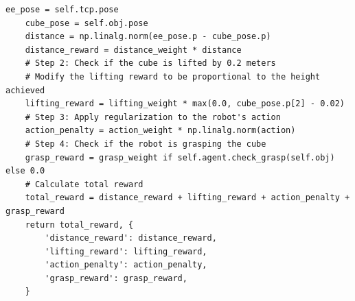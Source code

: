\documentclass{article}
\theoremstyle{plain}
\theoremstyle{definition}
\theoremstyle{remark}
\begin{document}
\begin{table}[!ht]
\begin{tcolorbox}
\begin{lstlisting}[breaklines]
    ee_pose = self.tcp.pose
    cube_pose = self.obj.pose
    distance = np.linalg.norm(ee_pose.p - cube_pose.p)
    distance_reward = distance_weight * distance
    # Step 2: Check if the cube is lifted by 0.2 meters
    # Modify the lifting reward to be proportional to the height achieved
    lifting_reward = lifting_weight * max(0.0, cube_pose.p[2] - 0.02)
    # Step 3: Apply regularization to the robot's action
    action_penalty = action_weight * np.linalg.norm(action)
    # Step 4: Check if the robot is grasping the cube
    grasp_reward = grasp_weight if self.agent.check_grasp(self.obj) else 0.0
    # Calculate total reward
    total_reward = distance_reward + lifting_reward + action_penalty + grasp_reward
    return total_reward, {
        'distance_reward': distance_reward,
        'lifting_reward': lifting_reward,
        'action_penalty': action_penalty,
        'grasp_reward': grasp_reward,
    }
\end{lstlisting}
\end{tcolorbox}
\label{tab:iterative_process_on_liftcube_1}
\end{table}
\end{document}

